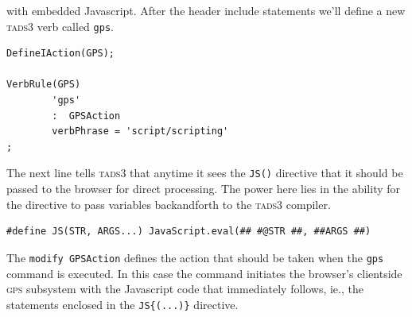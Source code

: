 with embedded Javascript. After the header include statements we'll define a new
\textsc{tads3} verb called \texttt{gps}.
\begin{lstlisting}
DefineIAction(GPS);

VerbRule(GPS)
        'gps'
        :  GPSAction
        verbPhrase = 'script/scripting'
;
\end{lstlisting}
The next line tells \textsc{tads3} that anytime it sees the \texttt{\scriptsize{JS()}}
directive that it should be passed to the browser for direct processing. The
power here lies in the ability for the directive to pass variables
back\textendash and\textendash forth to the \textsc{tads3} compiler.
\begin{lstlisting}
#define JS(STR, ARGS...) JavaScript.eval(## #@STR ##, ##ARGS ##)
\end{lstlisting}
The \texttt{\scriptsize{modify GPSAction}} defines the action that should be taken when the
\texttt{gps} command is executed. In this case the command initiates the
browser's client\textendash side \textsc{gps} subsystem with the Javascript code that
immediately follows, ie., the statements enclosed in the \texttt{\scriptsize{JS\{(...)\}}} directive.


